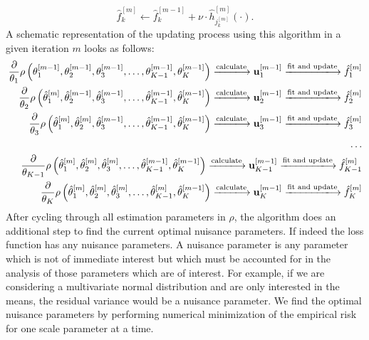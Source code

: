 \begin{equation}
    \hat{f}_k^{[m]}\gets\hat{f}_k^{[m-1]}+\nu\cdot \hat{h}^{[m]}_{j_k^{[m]}}(\cdot).
\end{equation}
A schematic representation of the updating process using this algorithm in a given iteration $m$ looks as follows:
\begin{align*}
    \frac{\partial}{\theta_1}\rho\left(\theta_1^{[m-1]},\theta_2^{[m-1]},\theta_3^{[m-1]},\ldots,\theta_{K-1}^{[m-1]},\theta_K^{[m-1]}\right)
    \xlongrightarrow{\text{calculate}}\u_{1}^{[m-1]}
    \xlongrightarrow{\text{fit and update}}\hat{f}_{1}^{[m]} \\
    \frac{\partial}{\theta_2}\rho\left(\hat{\theta}_1^{[m]},\hat{\theta}_2^{[m-1]},\hat{\theta}_3^{[m-1]},\ldots,\hat{\theta}_{K-1}^{[m-1]},\hat{\theta}_K^{[m-1]}\right)
    \xlongrightarrow{\text{calculate}} \u_{2}^{[m-1]}
    \xlongrightarrow{\text{fit and update}}\hat{f}_{2}^{[m]} \\
    \frac{\partial}{\theta_3}\rho\left(\hat{\theta}_1^{[m]},\hat{\theta}_2^{[m]},\hat{\theta}_3^{[m-1]},\ldots,\hat{\theta}_{K-1}^{[m-1]},\hat{\theta}_K^{[m-1]}\right)
    \xlongrightarrow{\text{calculate}}\u_{3}^{[m-1]}
    \xlongrightarrow{\text{fit and update}}\hat{f}_{3}^{[m]} \\
    \ldots\\
    \frac{\partial}{\theta_{K-1}}\rho\left(\hat{\theta}_1^{[m]},\hat{\theta}_2^{[m]},\hat{\theta}_3^{[m]},\ldots,\hat{\theta}_{K-1}^{[m-1]},\hat{\theta}_K^{[m-1]}\right)
    \xlongrightarrow{\text{calculate}}\u_{K-1}^{[m-1]}
    \xlongrightarrow{\text{fit and update}}\hat{f}_{K-1}^{[m]} \\
    \frac{\partial}{\theta_K}\rho\left(\hat{\theta}_1^{[m]},\hat{\theta}_2^{[m]},\hat{\theta}_3^{[m]},\ldots,\hat{\theta}_{K-1}^{[m]},\hat{\theta}_K^{[m-1]}\right)
    \xlongrightarrow{\text{calculate}}\u_{K}^{[m-1]}
    \xlongrightarrow{\text{fit and update}}\hat{f}_{K}^{[m]}
\end{align*}
After cycling through all estimation parameters in $\rho$, the algorithm does an additional step to find the current optimal nuisance parameters. If indeed the loss function has any nuisance parameters. A nuisance parameter is any parameter which is not of immediate interest but which must be accounted for in the analysis of those parameters which are of interest. For example, if we are considering a multivariate normal distribution and are only interested in the means, the residual variance would be a nuisance parameter. We find the optimal nuisance parameters by performing numerical minimization of the empirical risk for one scale parameter at a time.
